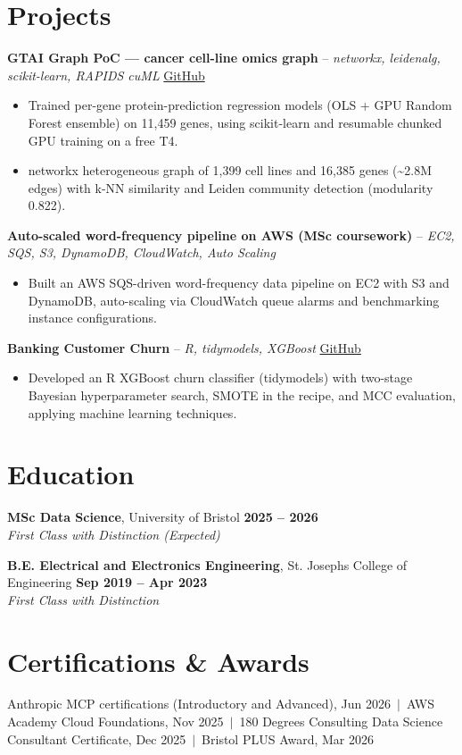 \documentclass[a4paper,11pt]{article}
\begin{document}
\section{Projects}
\noindent\textbf{GTAI Graph PoC — cancer cell-line omics graph} -- \textit{networkx, leidenalg, scikit-learn, RAPIDS cuML} \hfill \href{https://github.com/Thiruvel-AP/GTAI-GraphPOC}{GitHub}
\begin{itemize}
  \item Trained per-gene protein-prediction regression models (OLS + GPU Random Forest ensemble) on 11,459 genes, using scikit-learn and resumable chunked GPU training on a free T4.
  \item networkx heterogeneous graph of 1,399 cell lines and 16,385 genes (\textasciitilde{}2.8M edges) with k-NN similarity and Leiden community detection (modularity 0.822).
\end{itemize}
\vspace{3pt}
\noindent\textbf{Auto-scaled word-frequency pipeline on AWS (MSc coursework)} -- \textit{EC2, SQS, S3, DynamoDB, CloudWatch, Auto Scaling} \hfill 
\begin{itemize}
  \item Built an AWS SQS-driven word-frequency data pipeline on EC2 with S3 and DynamoDB, auto-scaling via CloudWatch queue alarms and benchmarking instance configurations.
\end{itemize}
\vspace{3pt}
\noindent\textbf{Banking Customer Churn} -- \textit{R, tidymodels, XGBoost} \hfill \href{https://github.com/Thiruvel-AP/Banking-Customer-Churn-Prediction}{GitHub}
\begin{itemize}
  \item Developed an R XGBoost churn classifier (tidymodels) with two-stage Bayesian hyperparameter search, SMOTE in the recipe, and MCC evaluation, applying machine learning techniques.
\end{itemize}

\section{Education}
\textbf{MSc Data Science}, University of Bristol \hfill \textbf{2025 – 2026}\\ \textit{First Class with Distinction (Expected)}\par
\vspace{3pt}
\textbf{B.E. Electrical and Electronics Engineering}, St. Joseph\textquotesingle{}s College of Engineering \hfill \textbf{Sep 2019 – Apr 2023}\\ \textit{First Class with Distinction}\par

\section{Certifications \& Awards}
Anthropic MCP certifications (Introductory and Advanced), Jun 2026 \,$|$\, AWS Academy Cloud Foundations, Nov 2025 \,$|$\, 180 Degrees Consulting Data Science Consultant Certificate, Dec 2025 \,$|$\, Bristol PLUS Award, Mar 2026
\end{document}
